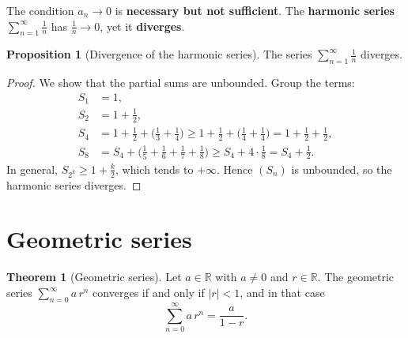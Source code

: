 \documentclass[12pt,a4paper,openany]{book}
\newcommand{\R}{\mathbb{R}}
\newcommand{\abs}[1]{\left\lvert #1 \right\rvert}
\theoremstyle{definition}
\newtheorem{theorem}{Theorem}[chapter]
\newtheorem{proposition}{Proposition}[chapter]
\theoremstyle{remark}
\begin{document}
\begin{tcolorbox}[
   colback=orange!5!white,
   colframe=orange!70!black,
   title={\textbf{WARNING: the converse is false!}},
   fonttitle=\bfseries,
   arc=2mm
]
The condition $a_n \to 0$ is \textbf{necessary but not sufficient}.
The \textbf{harmonic series} $\displaystyle\sum_{n=1}^{\infty}\frac{1}{n}$
has $\frac{1}{n} \to 0$, yet it \textbf{diverges}.
\end{tcolorbox}

\begin{proposition}[Divergence of the harmonic series]\label{prop:harmonic}
The series $\displaystyle\sum_{n=1}^{\infty}\frac{1}{n}$ diverges.
\end{proposition}

\begin{proof}
We show that the partial sums are unbounded. Group the terms:
\begin{align*}
   S_1 &= 1, \\
   S_2 &= 1 + \tfrac{1}{2}, \\
   S_4 &= 1 + \tfrac{1}{2} + \bigl(\tfrac{1}{3}+\tfrac{1}{4}\bigr)
         \geq 1 + \tfrac{1}{2} + \bigl(\tfrac{1}{4}+\tfrac{1}{4}\bigr)
         = 1 + \tfrac{1}{2} + \tfrac{1}{2}, \\
   S_8 &= S_4 + \bigl(\tfrac{1}{5}+\tfrac{1}{6}+\tfrac{1}{7}+\tfrac{1}{8}\bigr)
         \geq S_4 + 4 \cdot \tfrac{1}{8}
         = S_4 + \tfrac{1}{2}.
\end{align*}
In general, $S_{2^k} \geq 1 + \frac{k}{2}$, which tends to $+\infty$.
Hence $(S_n)$ is unbounded, so the harmonic series diverges.
\end{proof}

\section{Geometric series}\label{sec:geometric}

\begin{theorem}[Geometric series]\label{thm:geometric}
Let $a \in \R$ with $a \neq 0$ and $r \in \R$. The geometric series
$\displaystyle\sum_{n=0}^{\infty} a\,r^n$ converges if and only if $\abs{r} < 1$,
and in that case
\[
   \sum_{n=0}^{\infty} a\,r^n = \frac{a}{1-r}.
\]
\end{theorem}
\end{document}
